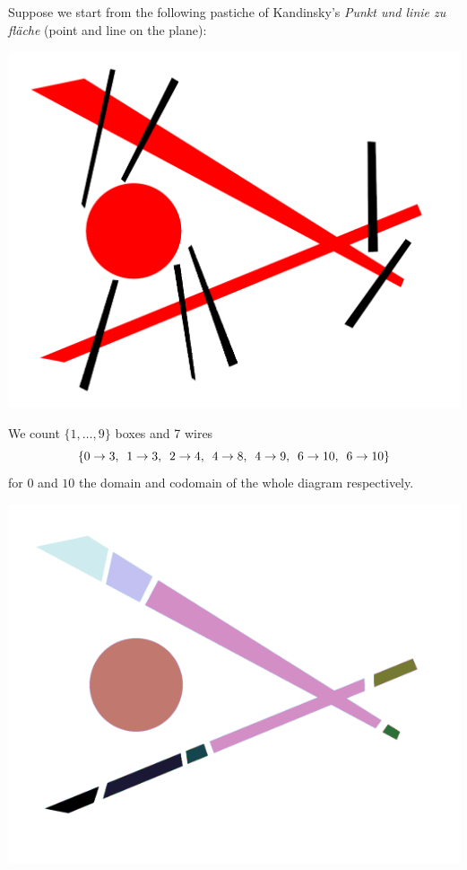 \begin{example}
Suppose we start from the following pastiche of Kandinsky's \emph{Punkt und linie zu fläche} (point and line on the plane):

\begin{center}
\includegraphics[scale=.4]{img/punkt-und-linie/start.png}
\end{center}
We count $\{ 1, \dots, 9 \}$ boxes and 7 wires
$$\{
0 \to 3, \enspace
1 \to 3, \enspace
2 \to 4, \enspace
4 \to 8, \enspace
4 \to 9, \enspace
6 \to 10, \enspace
6 \to 10 \}
$$
for $0$ and $10$ the domain and codomain of the whole diagram respectively.
\begin{center}
\includegraphics[scale=.2]{img/punkt-und-linie/boxes.png}

\end{center}
\end{example}
